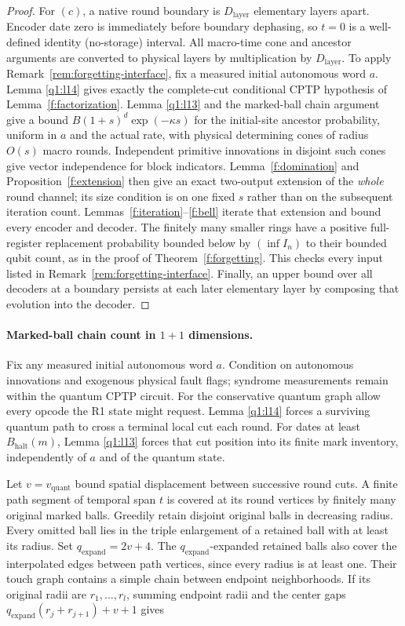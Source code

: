 \begin{proof}
For \((c)\), a native round boundary is \(D_{\mathrm{layer}}\) elementary layers apart. Encoder date zero is immediately before boundary dephasing, so \(t=0\) is a well-defined identity (no-storage) interval. All macro-time cone and ancestor arguments are converted to physical layers by multiplication by \(D_{\mathrm{layer}}\). To apply Remark~\ref{rem:forgetting-interface}, fix a measured initial autonomous word \(a\). Lemma \ref{q1:l14} gives exactly the complete-cut conditional CPTP hypothesis of Lemma~\ref{f:factorization}. Lemma \ref{q1:l13} and the marked-ball chain argument give a bound \(B(1+s)^{d} \exp (-\kappa s)\) for the initial-site ancestor probability, uniform in \(a\) and the actual rate, with physical determining cones of radius \(O(s)\) macro rounds. Independent primitive innovations in disjoint such cones give vector independence for block indicators. Lemma~\ref{f:domination} and Proposition~\ref{f:extension} then give an exact two-output extension of the \emph{whole} round channel; its size condition is on one fixed \(s\) rather than on the subsequent iteration count. Lemmas~\ref{f:iteration}--\ref{f:bell} iterate that extension and bound every encoder and decoder. The finitely many smaller rings have a positive full-register replacement probability bounded below by \((\inf  I_{n})\) to their bounded qubit count, as in the proof of Theorem~\ref{f:forgetting}. This checks every input listed in Remark~\ref{rem:forgetting-interface}. Finally, an upper bound over all decoders at a boundary persists at each later elementary layer by composing that evolution into the decoder. 
\end{proof}


\paragraph{Marked-ball chain count in \(1+1\) dimensions.}

Fix any measured initial autonomous word \(a\). Condition on autonomous innovations and exogenous physical fault flags; syndrome measurements remain within the quantum CPTP circuit. For the conservative quantum graph allow every opcode the R1 state might request. Lemma \ref{q1:l14} forces a surviving quantum path to cross a terminal local cut each round. For dates at least \(B_{\mathrm{halt}}(m)\), Lemma \ref{q1:l13} forces that cut position into its finite mark inventory, independently of \(a\) and of the quantum state.

Let \(v=v_{\mathrm{quant}}\) bound spatial displacement between successive round cuts. A finite path segment of temporal span \(t\) is covered at its round vertices by finitely many original marked balls. Greedily retain disjoint original balls in decreasing radius. Every omitted ball lies in the triple enlargement of a retained ball with at least its radius. Set \(q_{\mathrm{expand}}=2v+4\). The \(q_{\mathrm{expand}}\)-expanded retained balls also cover the interpolated edges between path vertices, since every radius is at least one. Their touch graph contains a simple chain between endpoint neighborhoods. If its original radii are \(r_{1},\dots,r_{l}\), summing endpoint radii and the center gaps \(q_{\mathrm{expand}}(r_{j}+r_{j+1})+v+1\) gives

